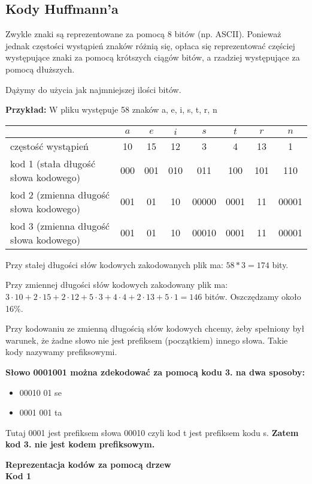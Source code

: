 \subsection{Kody Huffmann'a}
Zwykle znaki są reprezentowane za pomocą 8 bitów (np. ASCII). Ponieważ jednak częstości wystąpień znaków różnią się, opłaca się reprezentować częściej występujące znaki za pomocą krótszych ciągów bitów, a rzadziej  występujące za pomocą dłuższych.

Dążymy do użycia jak najmniejszej ilości bitów.

\textbf{Przykład:} W pliku występuje 58 znaków a, e, i, s, t, r, n
\begin{center}
\begin{tabular}{ l | c | c | c | c | c | c | c }
  	 										& $a$	& $e$ 	& $i$ 	& $s$ 	& $t$ 	& $r$ 	& $n$ 	\\ \hline
  częstość wystąpień 						& 10	&  15  	& 12	&  3  	&  4	&  13	&  1 	\\ \hline
  kod 1 (stała długość słowa kodowego) 		& 000 	& 001 	& 010	& 011 	& 100	& 101	& 110 	\\ \hline
  kod 2 (zmienna długość słowa kodowego) 	& 001 	& 01 	& 10	& 00000 & 0001	& 11	& 00001 \\ \hline
  kod 3 (zmienna długość słowa kodowego) 	& 001 	& 01 	& 10	& 00010 & 0001	& 11	& 00001  
\end{tabular}
\end{center}

Przy stałej długości słów kodowych zakodowanych plik ma: $58*3=174$ bity. 

Przy zmiennej długości słów kodowych zakodowany plik ma: $3 \cdot 10+2 \cdot 15+2 \cdot 12+5 \cdot 3+4 \cdot 4+2 \cdot 13+5 \cdot 1 = 146$ bitów. Oszczędzamy około 16$\%$.

Przy kodowaniu ze zmienną długością słów kodowych chcemy, żeby spełniony był warunek, że żadne słowo nie jest prefiksem (początkiem) innego słowa. Takie kody nazywamy prefiksowymi. 

\textbf{Słowo 0001001 można zdekodować za pomocą kodu 3. na dwa sposoby:}
\begin{itemize}
	\item 00010 01 se
	\item 0001 001 ta 
\end{itemize}
Tutaj 0001 jest prefiksem słowa 00010 czyli kod t jest prefiksem kodu s. \textbf{Zatem kod 3. nie jest kodem prefiksowym.}

\textbf{Reprezentacja kodów za pomocą drzew}\\
\textbf{Kod 1}

